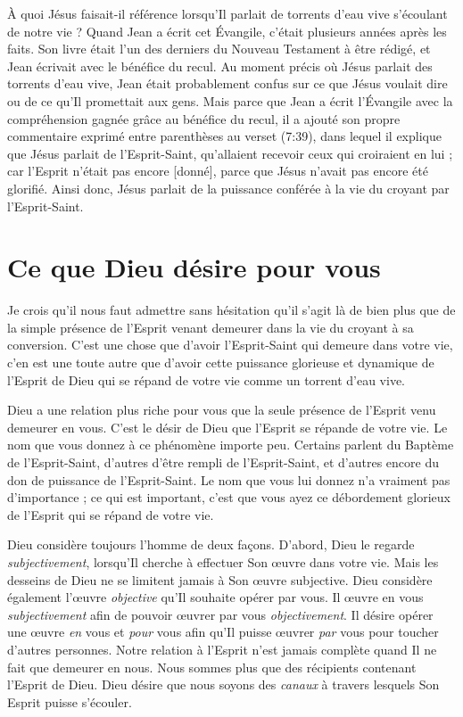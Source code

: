 À quoi Jésus faisait-il référence lorsqu'Il parlait de
 \Og torrents d'eau vive \Fg{} s'écoulant de notre vie ?
 Quand Jean a écrit cet Évangile, c'était plusieurs années après les faits.
 Son livre était l'un des derniers du Nouveau Testament à être rédigé,
 et Jean écrivait avec le bénéfice du recul. Au moment précis où Jésus parlait
 des torrents d'eau vive, Jean était probablement confus sur ce que
 Jésus voulait dire ou de ce qu'Il promettait aux gens.
 Mais parce que Jean a écrit l'Évangile avec la compréhension gagnée grâce
 au bénéfice du recul, il a ajouté son propre commentaire exprimé entre
 parenthèses au verset (7:39), dans lequel il explique que Jésus
 parlait de l'Esprit-Saint, \Og qu'allaient recevoir ceux qui croiraient
 en lui ; car l'Esprit n'était pas encore [donné], parce que Jésus n'avait
 pas encore été glorifié. \Fg{}
 Ainsi donc, Jésus parlait de la puissance conférée à la vie du croyant
 par l'Esprit-Saint.


\section{Ce que Dieu d\'esire pour vous}

Je crois qu'il nous faut admettre sans hésitation qu'il s'agit là de bien
 plus que de la simple présence de l'Esprit venant demeurer dans la vie
 du croyant à sa conversion. C'est une chose que d'avoir l'Esprit-Saint
 qui demeure dans votre vie, c'en est une toute autre que d'avoir cette puissance
 glorieuse et dynamique de l'Esprit de Dieu qui se répand de votre vie
 comme un torrent d'eau vive.

Dieu a une relation plus riche pour vous que la seule présence de l'Esprit
 venu demeurer en vous. C'est le désir de Dieu que l'Esprit se répande
 de votre vie. Le nom que vous donnez à ce phénomène importe peu.
 Certains parlent du Baptème de l'Esprit-Saint,
 d'autres d'être rempli de l'Esprit-Saint, et d'autres encore du don
 de puissance de l'Esprit-Saint. Le nom que vous lui donnez n'a vraiment
 pas d'im\-por\-tan\-ce ; ce qui est important, c'est que vous ayez ce débordement
 glorieux de l'Esprit qui se répand de votre vie.

Dieu considère toujours l'homme de deux façons. D'abord, Dieu le regarde
 \emph{subjectivement}, lorsqu'Il cherche à effectuer Son œuvre
 dans votre vie.
 Mais les desseins de Dieu ne se limitent jamais à Son œuvre subjective.
 Dieu considère également l'œuvre \emph{objective} qu'Il souhaite opérer
 par vous.
 Il œuvre en vous \emph{subjectivement} afin de pouvoir œuvrer par vous
 \emph{objectivement}. Il désire opérer une œuvre \emph{en} vous
 et \emph{pour} vous afin
 qu'Il puisse œuvrer \emph{par} vous pour toucher d'autres personnes.
 Notre relation à l'Esprit n'est jamais complète quand Il ne fait que
 demeurer en nous. Nous sommes plus que des récipients contenant
 l'Esprit de Dieu. Dieu désire que nous soyons des \emph{canaux} à travers
 lesquels Son Esprit puisse s'écouler.


